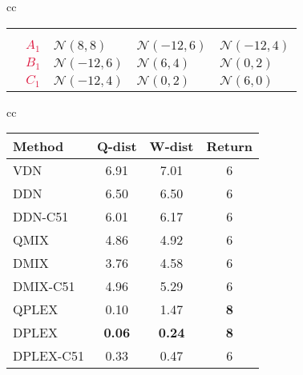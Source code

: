 \documentclass[twoside,11pt]{article}
\newcommand{\bb}[1]{\textcolor{myblue}{#1}}
\newcommand{\cc}[1]{\textcolor{crimson}{#1}}
\begin{document}
\begin{figure*}[t]
\begin{tabular}{cc}
\begin{minipage}{0.47\textwidth}
\small
\setlength{\extrarowheight}{3pt}
\vspace{-0.3cm}\hspace{-0.5cm}
\begin{tabular}{cc|*{3}{>{\centering\arraybackslash}p{.22\linewidth}|}}
	& \multicolumn{1}{c}{} & \multicolumn{3}{c}{\bb{Agent $2$}} \\
	& \multicolumn{1}{c}{} & \multicolumn{1}{c}{\bb{$A_2$}} & \multicolumn{1}{c}{\bb{$B_2$}} & \multicolumn{1}{c}{\bb{$C_2$}} \\ 
	\cline{3-5}
    \multirow{2}{*}{\rotatebox[origin=c]{90}{\cc{Agent $1$}}} & \cc{$A_1$} & $\mathcal{N}(8,8)$ & $\mathcal{N}(-12,6)$ & $\mathcal{N}(-12,4)$ \\ \cline{3-5}
    & \cc{$B_1$} & $\mathcal{N}(-12,6)$ & $\mathcal{N}(6,4)$ & $\mathcal{N}(0,2)$  \\\cline{3-5}
    & \cc{$C_1$} & $\mathcal{N}(-12,4)$ & $\mathcal{N}(0,2)$ & $\mathcal{N}(6,0)$  \\\cline{3-5}
\end{tabular}
\label{table:matrix-game}
\end{minipage}
\begin{tabular}{cc}
\begin{minipage}{0.45\textwidth}
\footnotesize
{}
\begin{tabular}{l|c|c|c}
\toprule
Method & Q-dist & W-dist & Return \\
\midrule
VDN & 6.91 & 7.01 & 6 \\
DDN & 6.50 & 6.50 & 6 \\
DDN-C51 & 6.01 & 6.17 & 6 \\
\hline
QMIX & 4.86 & 4.92 & 6 \\
DMIX & 3.76 & 4.58 & 6 \\
DMIX-C51 & 4.96 & 5.29 & 6 \\
\hline
QPLEX & 0.10 & 1.47 & \textbf{8} \\
DPLEX & \textbf{0.06} & \textbf{0.24} & \textbf{8} \\
DPLEX-C51 & 0.33 & 0.47 & 6 \\
\bottomrule
\end{tabular}
\label{table:matrix-game-results}
\end{minipage}
\end{tabular}
\end{tabular}
\end{figure*}
 
\end{document}
